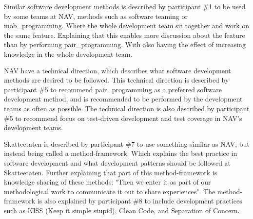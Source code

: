 Similar software development methods is described by participant \#1 to be used by some teams at NAV, methods such as software teaming or \gls{mob_programming}. Where the whole development team sit together and work on the same feature. Explaining that this enables more discussion about the feature than by performing \gls{pair_programming}. With also having the effect of increasing knowledge in the whole development team.


NAV have a technical direction, which describes what software development methods are desired to be followed. This technical direction is described by participant \#5 to recommend \gls{pair_programming} as a preferred software development method, and is recommended to be performed by the development teams as often as possible. The technical direction is also described by participant \#5 to recommend focus on test-driven development and test coverage in NAV's development teams. 


Skatteetaten is described by participant \#7 to use something similar as NAV, but instead being called a method-framework. Which explains the best practice in software development and what development patterns should be followed at Skatteetaten. Further explaining that part of this method-framework is knowledge sharing of these methods: "Then we enter it as part of our methodological work to communicate it out to share experiences". The method-framework is also explained by participant \#8 to include development practices such as KISS (Keep it simple stupid), Clean Code, and Separation of Concern.


